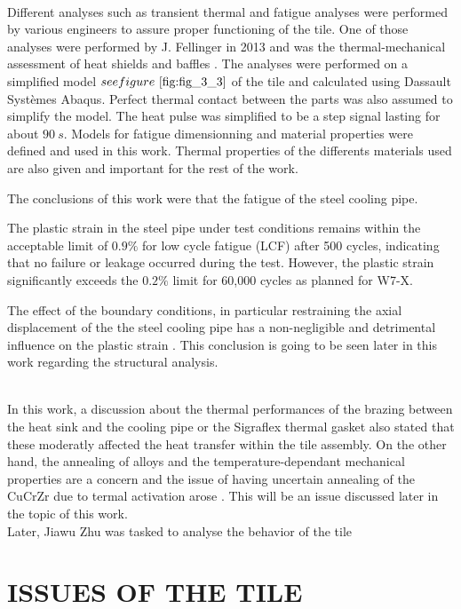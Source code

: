 \\
\break
\normalsize{\indent Different analyses such as transient thermal and fatigue analyses were performed by various engineers to assure proper functioning of the tile. One of those analyses were performed by J. Fellinger in 2013 and was the thermal-mechanical assessment of heat shields and baffles \cites{Fellinger_2013}. The analyses were performed on a simplified model $see figure \ \ref{fig:fig_3_3}$ of the tile and calculated using Dassault Systèmes Abaqus. Perfect thermal contact between the parts was also assumed to simplify the model. The heat pulse was simplified to be a step signal lasting for about $90 \ s$. Models for fatigue dimensionning and material properties were defined and used in this work. Thermal properties of the differents materials used are also given and important for the rest of the work.}
\\
\break
\normalsize{
\indent The conclusions of this work were that the fatigue of the steel cooling pipe.

 The plastic strain in the steel pipe under test conditions remains within the acceptable limit of $0.9 \% $ for low cycle fatigue (LCF) after 500 cycles, indicating that no failure or leakage occurred during the test. However, the plastic strain significantly exceeds the $0.2 \%$ limit for 60,000 cycles as planned for \acrshort{W7-X}.

The effect of the boundary conditions, in particular restraining the axial displacement of the the steel cooling pipe has a non-negligible and detrimental influence on the plastic strain \cites{Fellinger_2013}. This conclusion is going to be seen later in this work regarding the structural analysis.
}
\\
\break
\normalsize{\indent In this work, a discussion about the thermal performances of the brazing between the heat sink and the cooling pipe or the Sigraflex thermal gasket also stated that these moderatly affected the heat transfer within the tile assembly. On the other hand, the annealing of alloys and the temperature-dependant mechanical properties are a concern and the issue of having uncertain annealing of the \acrshort{CuCrZr} due to termal activation arose \cites{Fellinger_2013}. This will be an issue discussed later in the topic of this work.}
\\
\break
\normalsize{\indent Later, Jiawu Zhu was tasked to analyse the behavior of the tile }

\section{ISSUES OF THE TILE}

